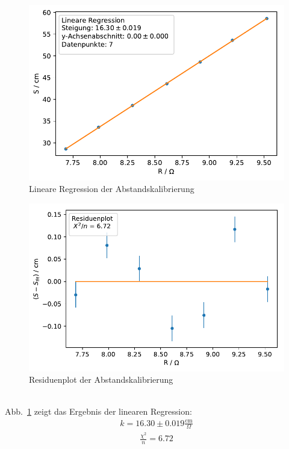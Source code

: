 \documentclass[12pt,a4paper]{article}
\begin{document}
\begin{figure}
	\centering
	\includegraphics[scale=1]{Bilder/Abstandskal_LinReg.pdf}
	\caption{Lineare Regression der Abstandskalibrierung}
	\label{Abstandskal_LinReg}
\end{figure}
\begin{figure}
	\centering
	\includegraphics[scale=1]{Bilder/Abstandskal_Residuen.pdf}
	\caption{Residuenplot der Abstandskalibrierung}
	\label{Abstandskal_Residuenplot}
\end{figure}
\\Abb.~\ref{Abstandskal_LinReg} zeigt das Ergebnis der linearen Regression:
\begin{align}
k = 16.30\pm0.019\frac{\text{cm}}{\Omega}
\end{align}
\begin{align}
\frac{\chi^2}{n}=6.72
\end{align}
\end{document}
